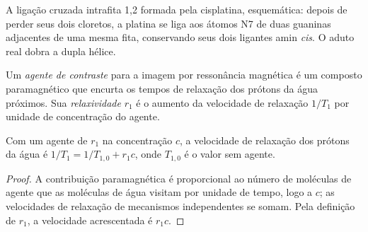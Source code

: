 \begin{omfigure}

{\small A ligação cruzada intrafita 1,2 formada pela cisplatina, esquemática: depois de
perder seus dois cloretos, a platina se liga aos átomos N7 de duas guaninas adjacentes
de uma mesma fita, conservando seus dois ligantes amin \textit{cis}. O aduto real
dobra a dupla hélice.}
\end{omfigure}

\begin{definition}\label{def:b3:bioinorganic:contrast}
Um \emph{agente de contraste} para a imagem por ressonância magnética é
um composto paramagnético que encurta os tempos de relaxação dos prótons da água
próximos. Sua \emph{relaxividade} $r_1$ é o aumento da
velocidade de relaxação $1/T_1$ por unidade de concentração do agente.
\end{definition}

\begin{proposition}\label{prop:b3:bioinorganic:relaxivity}
Com um agente de  $r_1$ na concentração $c$, a velocidade de relaxação dos prótons
da água é $1/T_1 = 1/T_{1,0} + r_1c$, onde $T_{1,0}$ é o valor sem agente.
\end{proposition}

\begin{proof}
A contribuição paramagnética é proporcional ao número de moléculas de agente
que as moléculas de água visitam por unidade de tempo, logo a $c$; as velocidades de relaxação de
mecanismos independentes se somam. Pela definição de $r_1$, a velocidade acrescentada é $r_1c$.
\end{proof}

